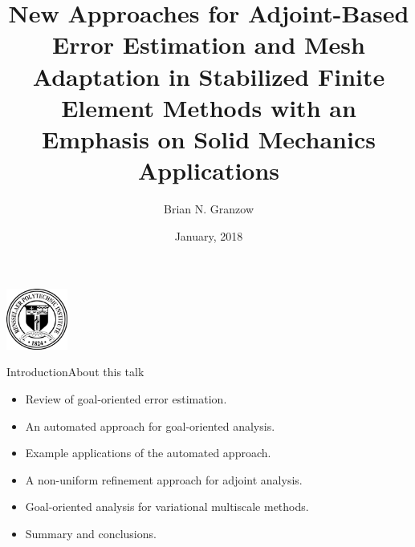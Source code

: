 \documentclass[fleqn]{beamer}
\title{New Approaches for Adjoint-Based
Error Estimation and Mesh Adaptation in
Stabilized Finite Element Methods with an
Emphasis on Solid Mechanics Applications}
\date{January, 2018}
\author{Brian N. Granzow}
\institute{
Mechanical Engineering\\
Rensselaer Polytechnic Instutite\\
Troy, NY 12180 USA}
\begin{document}
\beamertemplatenavigationsymbolsempty


\begin{frame}
\titlepage
\begin{center}
\includegraphics[width=0.15\textwidth]{../img/rpi_seal}
\end{center}
\end{frame}


\begin{frame}{Introduction}{About this talk}
\begin{itemize}
\item Review of goal-oriented error estimation.
\item An automated approach for goal-oriented analysis.
\item Example applications of the automated approach.
\item A non-uniform refinement approach for adjoint analysis.
\item Goal-oriented analysis for variational multiscale methods.
\item Summary and conclusions.
\end{itemize}
\end{frame}
\end{document}
